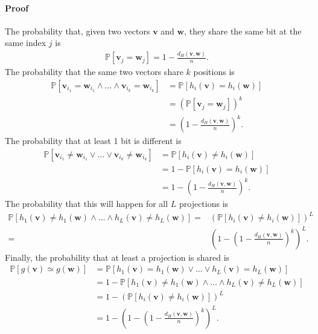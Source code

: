 \begin{enumerate}
  \paragraph{Proof} The probability that, given two vectors $\textbf{v}$ and
  $\textbf{w}$, they share the same bit at the same index $j$ is
  \begin{align*}
    \mathbb{P}[\textbf{v}_j = \textbf{w}_j] = 1 - \frac{d_H(\textbf{v},
    \textbf{w})}{n}.
  \end{align*}
  The probability that the same two vectors share $k$ positions is
  \begin{align*}
    \mathbb{P}[\textbf{v}_{i_1} = \textbf{w}_{i_1} \wedge \dots \wedge
    \textbf{v}_{i_k} = \textbf{w}_{i_k}]
    &= \mathbb{P}[h_i(\textbf{v}) = h_i(\textbf{w})] \\
    &= \left( \mathbb{P}[\textbf{v}_j = \textbf{w}_j] \right)^k \\
    &= \left( 1 - \frac{d_H(\textbf{v}, \textbf{w})}{n} \right)^k.
  \end{align*}
  The probability that at least 1 bit is different is
  \begin{align*}
    \mathbb{P}[\textbf{v}_{i_1} \neq \textbf{w}_{i_1} \vee \dots \vee
    \textbf{v}_{i_k} \neq \textbf{w}_{i_k}]
    &= \mathbb{P}[h_i(\textbf{v}) \neq h_i(\textbf{w})] \\
    &= 1 - \mathbb{P}[h_i(\textbf{v}) = h_i(\textbf{w})] \\
    &= 1 - \left( 1 - \frac{d_H(\textbf{v}, \textbf{w})}{n} \right)^k.
  \end{align*}
  The probability that this will happen for all $L$ projections is
  \begin{align*}
    \mathbb{P}[h_1(\textbf{v}) \neq h_1(\textbf{w}) \wedge \dots \wedge
    h_L(\textbf{v}) \neq h_L(\textbf{w})] = &\left(\mathbb{P}[h_i(\textbf{v})
    \neq h_i(\textbf{w})] \right)^L \\ = &\left( 1 - \left( 1 -
    \frac{d_H(\textbf{v}, \textbf{w})}{n} \right)^k \right)^L.
  \end{align*}
  Finally, the probability that at least a projection is shared is
  \begin{align*}
    \mathbb{P}[g(\textbf{v}) \simeq g(\textbf{w})] &=
    \mathbb{P}[h_1(\textbf{v}) = h_1(\textbf{w}) \vee \dots \vee
    h_L(\textbf{v}) = h_L(\textbf{w})] \\ &= 1 -\mathbb{P}[h_1(\textbf{v}) \neq
    h_1(\textbf{w}) \wedge \dots \wedge h_L(\textbf{v}) \neq h_L(\textbf{w})] \\
    &= 1 - \left(\mathbb{P}[h_i(\textbf{v}) \neq h_i(\textbf{w})] \right)^L \\
    &= 1 - \left( 1 -\left( 1 - \frac{d_H(\textbf{v}, \textbf{w})}{n} \right)^k
    \right)^L.
  \end{align*}


\end{enumerate}
